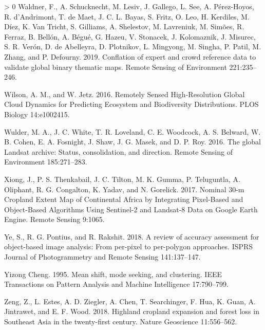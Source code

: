 \documentclass[11pt,a4paper]{article}
\newlength{\cslhangindent}
\newenvironment{CSLReferences}[3] %
 {%
  \setlength{\parindent}{0pt}
  \ifodd #1 \everypar{\setlength{\hangindent}{\cslhangindent}}\ignorespaces\fi
  \ifnum #2 > 0
  \setlength{\parskip}{#2\baselineskip}
  \fi
 }%
 {}
\begin{document}
\begin{CSLReferences}{1}{0}
\leavevmode\hypertarget{ref-WaldnerConflationexpertcrowd2019}{}%
Waldner, F., A. Schucknecht, M. Lesiv, J. Gallego, L. See, A.
Pérez-Hoyos, R. d'Andrimont, T. de Maet, J. C. L. Bayas, S. Fritz, O.
Leo, H. Kerdiles, M. Díez, K. Van Tricht, S. Gilliams, A. Shelestov, M.
Lavreniuk, M. Simões, R. Ferraz, B. Bellón, A. Bégué, G. Hazeu, V.
Stonacek, J. Kolomaznik, J. Misurec, S. R. Verón, D. de Abelleyra, D.
Plotnikov, L. Mingyong, M. Singha, P. Patil, M. Zhang, and P. Defourny.
2019. Conflation of expert and crowd reference data to validate global
binary thematic maps. Remote Sensing of Environment 221:235--246.

\leavevmode\hypertarget{ref-WilsonRemotelySensedHighResolution2016}{}%
Wilson, A. M., and W. Jetz. 2016. Remotely {Sensed High}-{Resolution
Global Cloud Dynamics} for {Predicting Ecosystem} and {Biodiversity
Distributions}. PLOS Biology 14:e1002415.

\leavevmode\hypertarget{ref-WulderglobalLandsatarchive2016}{}%
Wulder, M. A., J. C. White, T. R. Loveland, C. E. Woodcock, A. S.
Belward, W. B. Cohen, E. A. Fosnight, J. Shaw, J. G. Masek, and D. P.
Roy. 2016. The global {Landsat} archive: {Status}, consolidation, and
direction. Remote Sensing of Environment 185:271--283.

\leavevmode\hypertarget{ref-XiongNominal30mCropland2017}{}%
Xiong, J., P. S. Thenkabail, J. C. Tilton, M. K. Gumma, P. Teluguntla,
A. Oliphant, R. G. Congalton, K. Yadav, and N. Gorelick. 2017. Nominal
30-m {Cropland Extent Map} of {Continental Africa} by {Integrating
Pixel}-{Based} and {Object}-{Based Algorithms Using Sentinel}-2 and
{Landsat}-8 {Data} on {Google Earth Engine}. Remote Sensing 9:1065.

\leavevmode\hypertarget{ref-yeReviewAccuracyAssessment2018}{}%
Ye, S., R. G. Pontius, and R. Rakshit. 2018. A review of accuracy
assessment for object-based image analysis: {From} per-pixel to
per-polygon approaches. ISPRS Journal of Photogrammetry and Remote
Sensing 141:137--147.

\leavevmode\hypertarget{ref-YizongChengMeanshiftmode1995a}{}%
Yizong Cheng. 1995. Mean shift, mode seeking, and clustering. IEEE
Transactions on Pattern Analysis and Machine Intelligence 17:790--799.

\leavevmode\hypertarget{ref-ZengHighlandcroplandexpansion2018}{}%
Zeng, Z., L. Estes, A. D. Ziegler, A. Chen, T. Searchinger, F. Hua, K.
Guan, A. Jintrawet, and E. F. Wood. 2018. Highland cropland expansion
and forest loss in {Southeast Asia} in the twenty-first century. Nature
Geoscience 11:556--562.


\end{CSLReferences}
\end{document}
